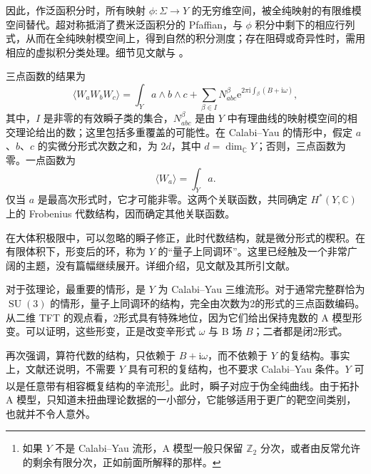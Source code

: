 因此，作泛函积分时，所有映射 $\phi\colon\Sigma\to Y$ 的无穷维空间，被全纯映射的有限维模空间替代。超对称抵消了费米泛函积分的 Pfaffian，与 $\phi$ 积分中剩下的相应行列式，从而在全纯映射模空间上，得到自然的积分测度；存在阻碍或奇异性时，需用相应的虚拟积分类处理。细节见文献与 。

三点函数的结果为
\begin{equation}\label{eq:3.121}
\langle W_aW_bW_c\rangle
=\int_Ya\wedge b\wedge c
+\sum_{\beta\in I}N_{abc}^\beta
\mathrm{e}^{2\pi\mathrm{i}\int_\beta(B+\mathrm{i}\omega)},
\end{equation}
其中，$I$ 是非零的有效瞬子类的集合，$N_{abc}^\beta$ 是由 $Y$ 中有理曲线的映射模空间的相交理论给出的数；这里包括多重覆盖的可能性。在 Calabi--Yau 的情形中，假定 $a$、$b$、$c$ 的实微分形式次数之和，为 $2d$，其中 $d=\dim_{\mathbb{C}}Y$；否则，三点函数为零。一点函数为
\begin{equation}\label{eq:3.122}
\langle W_a\rangle=\int_Ya.
\end{equation}
仅当 $a$ 是最高次形式时，它才可能非零。这两个关联函数，共同确定 $H^*(Y,\mathbb{C})$ 上的 Frobenius 代数结构，因而确定其他关联函数。

在大体积极限中，可以忽略的瞬子修正，此时代数结构，就是微分形式的楔积。在有限体积下，形变后的环，称为 $Y$ 的“量子上同调环”。这里已经触及一个非常广阔的主题，没有篇幅继续展开。详细介绍，见文献及其所引文献。

对于弦理论，最重要的情形，是 $Y$ 为 Calabi--Yau 三维流形。对于通常完整群恰为 $\operatorname{SU}(3)$ 的情形，量子上同调环的结构，完全由次数为2的形式的三点函数编码。从二维 TFT 的观点看，2形式具有特殊地位，因为它们给出保持鬼数的 A 模型形变。可以证明，这些形变，正是改变辛形式 $\omega$ 与 B 场 $B$；二者都是闭2形式。

再次强调，算符代数的结构，只依赖于 $B+\mathrm{i}\omega$，而不依赖于 $Y$ 的复结构。事实上，文献还说明，不需要 $Y$ 具有可积的复结构，也不要求 Calabi--Yau 条件。$Y$ 可以是任意带有相容概复结构的辛流形\footnote{如果 $Y$ 不是 Calabi--Yau 流形，A 模型一般只保留 $\mathbb{Z}_2$ 分次，或者由反常允许的剩余有限分次，正如前面所解释的那样。}。此时，瞬子对应于伪全纯曲线。由于拓扑 A 模型，只知道未扭曲理论数据的一小部分，它能够适用于更广的靶空间类别，也就并不令人意外。

